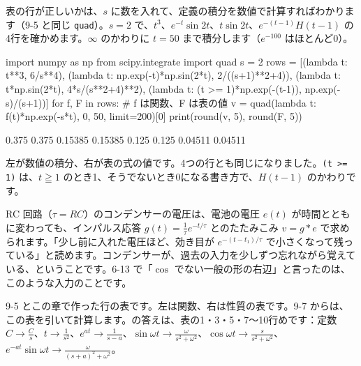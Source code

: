 表の行が正しいかは、$s$ に数を入れて、定義の積分を数値で計算すればわかります（9-5 と同じ \texttt{quad}）。$s=2$ で、$t^3$、$e^{-t}\sin2t$、$t\sin2t$、$e^{-(t-1)}H(t-1)$ の4行を確かめます。$\infty$ のかわりに $t=50$ まで積分します（$e^{-100}$ はほとんど0）。
\begin{bkcode}[Python]
import numpy as np
from scipy.integrate import quad
s = 2
rows = [(lambda t: t**3, 6/s**4),
        (lambda t: np.exp(-t)*np.sin(2*t), 2/((s+1)**2+4)),
        (lambda t: t*np.sin(2*t), 4*s/(s**2+4)**2),
        (lambda t: (t >= 1)*np.exp(-(t-1)), np.exp(-s)/(s+1))]
for f, F in rows:                \# f は関数、F は表の値
    v = quad(lambda t: f(t)*np.exp(-s*t), 0, 50, limit=200)[0]
    print(round(v, 5), round(F, 5))
\end{bkcode}
\begin{bkcodeout}[実行結果]
0.375 0.375
0.15385 0.15385
0.125 0.125
0.04511 0.04511
\end{bkcodeout}
左が数値の積分、右が表の式の値です。4つの行とも同じになりました。\texttt{(t >= 1)} は、$t\geqq1$ のとき1、そうでないとき0になる書き方で、$H(t-1)$ のかわりです。


\begin{motto}[5]
RC 回路（$\tau=RC$）のコンデンサーの電圧は、電池の電圧 $e(t)$ が時間とともに変わっても、インパルス応答 $g(t)=\frac{1}{\tau}e^{-t/\tau}$ とのたたみこみ $v=g*e$ で求められます。「少し前に入れた電圧ほど、効き目が $e^{-(t-t_1)/\tau}$ で小さくなって残っている」と読めます。コンデンサーが、過去の入力を少しずつ忘れながら覚えている、ということです。6-13 で「$\cos$ でない一般の形の右辺」と言ったのは、このような入力のことです。
\end{motto}


\label{bk:9-6:hyou}9-5 とこの章で作った行の表です。左は関数、右は性質の表です。9-7 からは、この表を引いて計算します。\bkhatenaref の答えは、表の1・3・5・7〜10行めです：定数 $C\to\frac{C}{s}$、$t\to\frac{1}{s^2}$、$e^{at}\to\frac{1}{s-a}$、$\sin\omega t\to\frac{\omega}{s^2+\omega^2}$、$\cos\omega t\to\frac{s}{s^2+\omega^2}$、$e^{-at}\sin\omega t\to\frac{\omega}{(s+a)^2+\omega^2}$。

